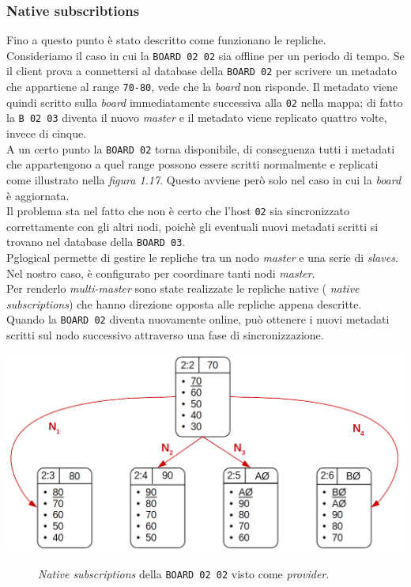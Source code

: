 \subsubsection{Native subscribtions}
Fino a questo punto \`{e} stato descritto come funzionano le repliche.\\
Consideriamo il caso in cui la \verb"BOARD 02 02" sia offline per un periodo di tempo. Se il client prova a connettersi al database della \verb"BOARD 02" per scrivere un metadato che appartiene al range \verb"70-80", vede che la \textit{board} non risponde. Il metadato viene quindi scritto sulla \textit{board} immediatamente successiva alla \verb"02" nella mappa; di fatto la \verb"B 02 03" diventa il nuovo \textit{master} e il metadato viene replicato quattro volte, invece di cinque.\\
A un certo punto la \verb"BOARD 02" torna disponibile, di conseguenza tutti i metadati che appartengono a quel range possono essere scritti normalmente e replicati come illustrato nella \textit{figura 1.17}. Questo avviene per\`{o} solo nel caso in cui la \textit{board} \`{e} aggiornata.\\
Il problema sta nel fatto che non \`{e} certo che l'host \verb"02" sia sincronizzato correttamente con gli altri nodi, poich\`{e} gli eventuali nuovi metadati scritti si trovano nel database della \verb"BOARD 03".\\
Pglogical permette di gestire le repliche tra un nodo \textit{master} e una serie di \textit{slaves}. Nel nostro caso, \`{e} configurato per coordinare tanti nodi \textit{master}. \\
Per renderlo \textit{multi-master} sono state realizzate le repliche native ( \textit{native subscriptions}) che hanno direzione opposta alle repliche appena descritte.\\
Quando la \verb"BOARD 02" diventa nuovamente online, pu\`{o} ottenere i nuovi metadati scritti sul nodo successivo attraverso una fase di sincronizzazione.

\begin{center}
\includegraphics[scale=0.50]{img/prov_native.png}
\end{center}
\begin{figure}[htbp]
\caption{\textit{Native subscriptions} della \verb"BOARD 02 02" visto come \textit{provider}. \label{figura1.17}}
\end{figure}

